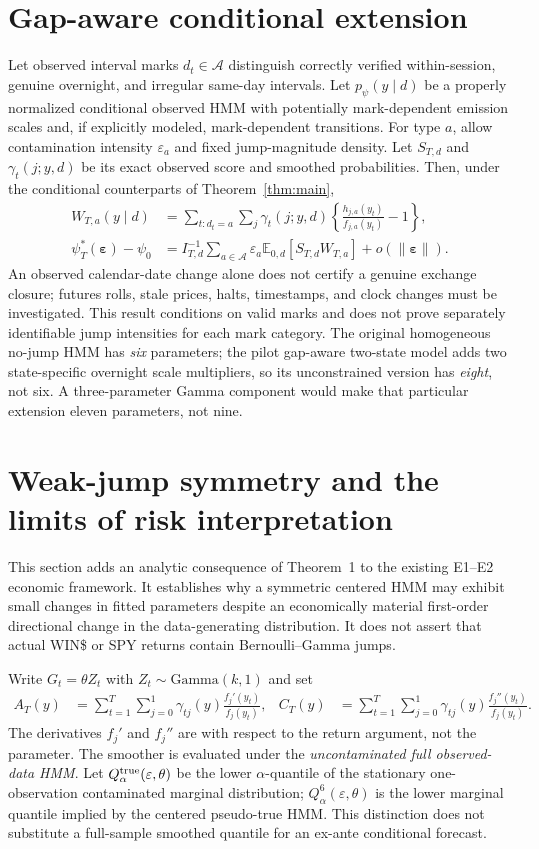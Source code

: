 \documentclass[11pt,a4paper]{article}
\newcommand{\E}{\mathbb E}
\newcommand{\eps}{\varepsilon}
\newcommand{\bt}{\boldsymbol}
\begin{document}
\section{Gap-aware conditional extension}
Let observed interval marks $d_t\in\mathcal A$ distinguish correctly verified within-session, genuine overnight, and irregular same-day intervals. Let $p_\psi(y\mid d)$ be a properly normalized conditional observed HMM with potentially mark-dependent emission scales and, if explicitly modeled, mark-dependent transitions. For type $a$, allow contamination intensity $\eps_a$ and fixed jump-magnitude density. Let $S_{T,d}$ and $\gamma_t(j;y,d)$ be its exact observed score and smoothed probabilities. Then, under the conditional counterparts of Theorem~\ref{thm:main},
\begin{align}
W_{T,a}(y\mid d)&=\sum_{t:d_t=a}\sum_j\gamma_t(j;y,d)
\left\{\frac{h_{j,a}(y_t)}{f_{j,a}(y_t)}-1\right\},\\
\psi_T^*(\bt\eps)-\psi_0&=I_{T,d}^{-1}\sum_{a\in\mathcal A}\eps_a\E_{0,d}[S_{T,d}W_{T,a}]+o(\|\bt\eps\|).\label{eq:gap}
\end{align}
An observed calendar-date change alone does not certify a genuine exchange closure; futures rolls, stale prices, halts, timestamps, and clock changes must be investigated. This result conditions on valid marks and does not prove separately identifiable jump intensities for each mark category. The original homogeneous no-jump HMM has \emph{six} parameters; the pilot gap-aware two-state model adds two state-specific overnight scale multipliers, so its unconstrained version has \emph{eight}, not six. A three-parameter Gamma component would make that particular extension eleven parameters, not nine.


\section{Weak-jump symmetry and the limits of risk interpretation}
\label{sec:weak-econ}
This section adds an analytic consequence of Theorem~1 to the existing E1--E2 economic framework. It establishes why a symmetric centered HMM may exhibit small changes in fitted parameters despite an economically material first-order directional change in the data-generating distribution. It does not assert that actual WIN\$ or SPY returns contain Bernoulli--Gamma jumps.

Write $G_t=\theta Z_t$ with $Z_t\sim\mathrm{Gamma}(k,1)$ and set
\begin{align}
A_T(y)&=\sum_{t=1}^{T}\sum_{j=0}^{1}\gamma_{tj}(y)\frac{f_j'(y_t)}{f_j(y_t)},
& C_T(y)&=\sum_{t=1}^{T}\sum_{j=0}^{1}\gamma_{tj}(y)\frac{f_j''(y_t)}{f_j(y_t)}.\label{eq:p3-ac}
\end{align}
The derivatives $f_j'$ and $f_j''$ are with respect to the return argument, not the parameter. The smoother is evaluated under the \emph{uncontaminated full observed-data HMM}. Let $Q_{\alpha}^{\rm true}(\eps,\theta)$ be the lower $\alpha$-quantile of the stationary one-observation contaminated marginal distribution; $Q_{\alpha}^{6}(\eps,\theta)$ is the lower marginal quantile implied by the centered pseudo-true HMM. This distinction does not substitute a full-sample smoothed quantile for an ex-ante conditional forecast.
\end{document}
